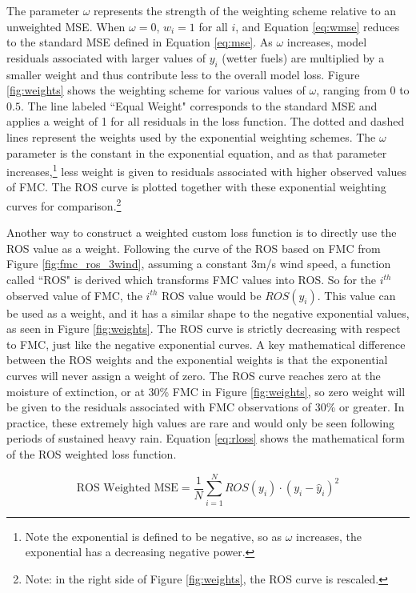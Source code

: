 \documentclass[11pt]{article}%
\begin{document}
The parameter $\omega$ represents the strength of the weighting scheme relative to an unweighted MSE. When $\omega = 0$, $w_i = 1$ for all $i$, and Equation \ref{eq:wmse} reduces to the standard MSE defined in Equation \ref{eq:mse}. As $\omega$ increases, model residuals associated with larger values of $y_i$ (wetter fuels) are multiplied by a smaller weight and thus contribute less to the overall model loss. Figure \ref{fig:weights} shows the weighting scheme for various values of $\omega$, ranging from $0$ to $0.5$. The line labeled ``Equal Weight" corresponds to the standard MSE and applies a weight of 1 for all residuals in the loss function. The dotted and dashed lines represent the weights used by the exponential weighting schemes. The $\omega$ parameter is the constant in the exponential equation, and as that parameter increases,\footnote{Note the exponential is defined to be negative, so as $\omega$ increases, the exponential has a decreasing negative power.} less weight is given to residuals associated with higher observed values of FMC. The ROS curve is plotted together with these exponential weighting curves for comparison.\footnote{Note: in the right side of Figure \ref{fig:weights}, the ROS curve is rescaled.}

Another way to construct a weighted custom loss function is to directly use the ROS value as a weight. Following the curve of the ROS based on FMC from Figure \ref{fig:fmc_ros_3wind}, assuming a constant 3m/s wind speed, a function called ``ROS" is derived which transforms FMC values into ROS. So for the $i^{th}$ observed value of FMC, the $i^{th}$ ROS value would be $ROS(y_i)$. This value can be used as a weight, and it has a similar shape to the negative exponential values, as seen in Figure \ref{fig:weights}. The ROS curve is strictly decreasing with respect to FMC, just like the negative exponential curves. A key mathematical difference between the ROS weights and the exponential weights is that the exponential curves will never assign a weight of zero. The ROS curve reaches zero at the moisture of extinction, or at 30\% FMC in Figure \ref{fig:weights}, so zero weight will be given to the residuals associated with FMC observations of 30\% or greater. In practice, these extremely high values are rare and would only be seen following periods of sustained heavy rain. Equation \ref{eq:rloss} shows the mathematical form of the ROS weighted loss function.

\begin{equation}
    \label{eq:rloss}
    \text{ROS Weighted MSE} = \frac{1}{N}\sum_{i=1}^N ROS(y_i)\cdot (y_i - \hat y_i)^2
\end{equation}
\end{document}
